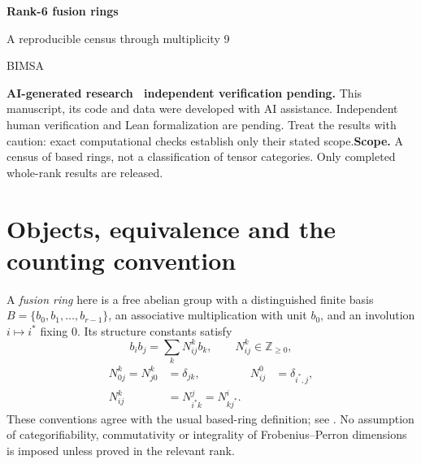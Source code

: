 \documentclass[11pt,a4paper]{article}
\theoremstyle{definition}\newtheorem{definition}[theorem]{Definition}\newtheorem{remark}[theorem]{Remark}
\newcommand{\NN}{\mathbb Z_{\geq0}}\newcommand{\FPdim}{\operatorname{FPdim}}
\begin{document}
\par\vspace{1cm}
{\sffamily\Huge\bfseries\color{ink} Rank-6 fusion rings\par}
\vspace{0.35cm}
{\sffamily\Large A reproducible census through multiplicity 9\par}
\vspace{0.65cm}{\large Sébastien Palcoux}\par{\small BIMSA}\par\vspace{0.35cm}{\small Computational companion, 26 October 2026}\par\vspace{0.8cm}
\begin{abstract}
We explain the exact enumeration of all based fusion rings of rank 6 through multiplicity 9, comprising 25,421 isomorphism classes. The account separates the mathematical coverage argument, the completed search, and independent verification of the emitted tensors. All duality types are included, and no categorifiability filter is applied. Code, machine-readable counts, full multiplication tensors and provenance records accompany the text.
\end{abstract}\vspace{0.4cm}\noindent\textbf{AI-generated research \textperiodcentered\ independent verification pending.} This manuscript, its code and data were developed with AI assistance. Independent human verification and Lean formalization are pending. Treat the results with caution: exact computational checks establish only their stated scope.\vfill\noindent\textbf{Scope.} A census of based rings, not a classification of tensor categories. Only completed whole-rank results are released.\newpage\tableofcontents\newpage

\section{Objects, equivalence and the counting convention}
A \emph{fusion ring} here is a free abelian group with a distinguished finite basis
$B=\{b_0,b_1,\ldots,b_{r-1}\}$, an associative multiplication with unit $b_0$,
and an involution $i\mapsto i^*$ fixing $0$. Its structure constants satisfy
\[
b_i b_j=\sum_k N_{ij}^{k}b_k,\qquad N_{ij}^{k}\in\NN,
\]
\begin{align}
N_{0j}^{k}=N_{j0}^{k}&=\delta_{jk},&N_{ij}^{0}&=\delta_{i^*,j},\\
N_{ij}^{k}&=N_{i^*k}^{j}=N_{kj^*}^{i}.&&\label{eq:reciprocity}
\end{align}
These conventions agree with the usual based-ring definition; see
\cite{EGNO,VS}. No assumption of categorifiability, commutativity or integrality
of Frobenius--Perron dimensions is imposed unless proved in the relevant rank.
\end{document}
